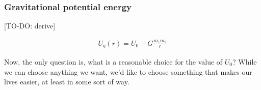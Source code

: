 \documentclass{article}
\begin{document}

\subsubsection*{Gravitational potential energy}

[TO-DO: derive]

\begin{align*}
	U_g(r) = U_0 - G\frac{m_1 m_2}{r}
\end{align*}

Now, the only question is, what is a reasonable choice for the value of $U_0$? While we can choose anything we want, we'd like to choose something that makes our lives easier, at least in some sort of way.
\end{document}
